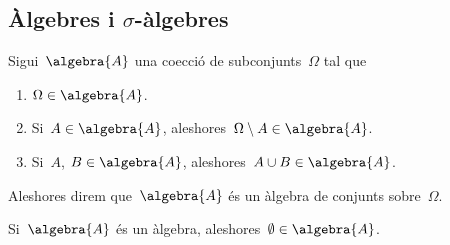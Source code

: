 \documentclass[../Apunts.tex]{subfiles}
\begin{document}
	\subsection{Àlgebres i \(\sigma\)-àlgebres}
	\begin{definition}[Àlgebra]
		\label{def:àlgebra}
		Sigui~\(\algebra{A}\) una co{\lgem}ecció de subconjunts~\(\Omega\) tal que
		\begin{enumerate}
			\item \(\Omega\in\algebra{A}\).
			\item Si~\(A\in\algebra{A}\), aleshores~\(\Omega\setminus A\in\algebra{A}\).
			\item Si~\(A\), \(B\in\algebra{A}\), aleshores~\(A\cup B\in\algebra{A}\).
		\end{enumerate}
		Aleshores direm que~\(\algebra{A}\) és un àlgebra de conjunts sobre~\(\Omega\).
	\end{definition}
	\begin{observation}
		\label{obs:el conjunt buit pertany a qualsevol àlgebra}
		Si~\(\algebra{A}\) és un àlgebra, aleshores~\(\emptyset\in\algebra{A}\).
	\end{observation}
\end{document}
